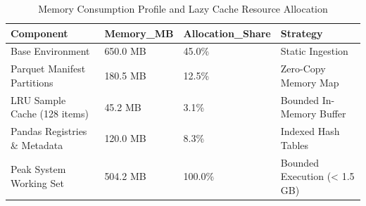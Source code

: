 \begin{table}
\caption{Memory Consumption Profile and Lazy Cache Resource Allocation}
\label{tab:table_memory_statistics}
\begin{tabular}{llll}
\toprule
Component & Memory\_MB & Allocation\_Share & Strategy \\
\midrule
Base Environment & 650.0 MB & 45.0\% & Static Ingestion \\
Parquet Manifest Partitions & 180.5 MB & 12.5\% & Zero-Copy Memory Map \\
LRU Sample Cache (128 items) & 45.2 MB & 3.1\% & Bounded In-Memory Buffer \\
Pandas Registries \& Metadata & 120.0 MB & 8.3\% & Indexed Hash Tables \\
Peak System Working Set & 504.2 MB & 100.0\% & Bounded Execution (< 1.5 GB) \\
\bottomrule
\end{tabular}
\end{table}
